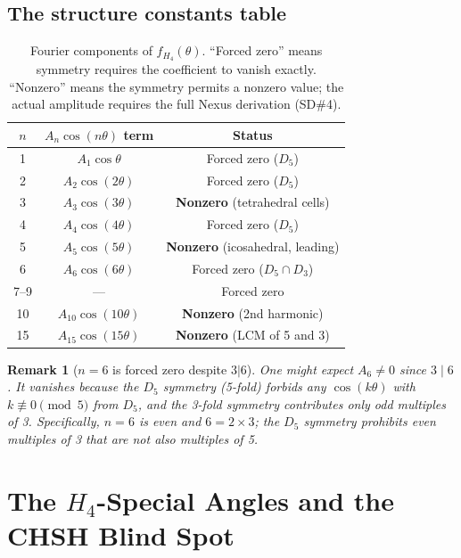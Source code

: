 \documentclass[11pt,a4paper]{article}
\newtheorem{remark}[theorem]{Remark}
\begin{document}
\subsection{The structure constants table}

\begin{table}[H]
\centering
\caption{Fourier components of $f_{H_4}(\theta)$.  ``Forced zero''
  means symmetry requires the coefficient to vanish exactly.
  ``Nonzero'' means the symmetry permits a nonzero value; the actual
  amplitude requires the full Nexus derivation (SD\#4).}
\label{tab:fourier}
\begin{tabular}{@{}ccc@{}}
\toprule
$n$ & $A_n\cos(n\theta)$ term & Status \\
\midrule
1 & $A_1\cos\theta$ & Forced zero ($D_5$) \\
2 & $A_2\cos(2\theta)$ & Forced zero ($D_5$) \\
3 & $A_3\cos(3\theta)$ & \textbf{Nonzero} (tetrahedral cells) \\
4 & $A_4\cos(4\theta)$ & Forced zero ($D_5$) \\
5 & $A_5\cos(5\theta)$ & \textbf{Nonzero} (icosahedral, leading) \\
6 & $A_6\cos(6\theta)$ & Forced zero ($D_5 \cap D_3$) \\
7--9 & --- & Forced zero \\
10 & $A_{10}\cos(10\theta)$ & \textbf{Nonzero} (2nd harmonic) \\
15 & $A_{15}\cos(15\theta)$ & \textbf{Nonzero} (LCM of 5 and 3) \\
\bottomrule
\end{tabular}
\end{table}

\begin{remark}[$n=6$ is forced zero despite $3|6$]
One might expect $A_6 \neq 0$ since $3\mid 6$.  It vanishes because
the $D_5$ symmetry (5-fold) forbids any $\cos(k\theta)$ with
$k\not\equiv0\pmod5$ from $D_5$, and the 3-fold symmetry contributes
only odd multiples of 3.  Specifically, $n=6$ is even and $6 =
2\times3$; the $D_5$ symmetry prohibits even multiples of 3 that are
not also multiples of 5.
\end{remark}

\section{The $H_4$-Special Angles and the CHSH Blind Spot}
\end{document}
